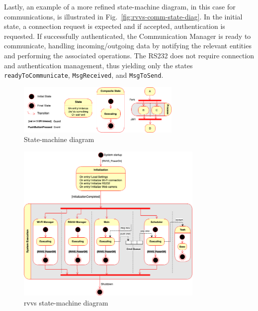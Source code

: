Lastly, an example of a more refined state-machine diagram, in this case for
communications, is illustrated in Fig.~\ref{fig:rvvs-comm-state-diag}. In the
initial state, a connection request is expected and if accepted, authentication
is requested. If successfully authenticated, the Communication Manager is ready
to communicate, handling incoming/outgoing data by notifying the relevant
entities and performing the associated operations. The RS232 does not require
connection and authentication management, thus yielding only the states
\texttt{readyToCommunicate}, \texttt{MsgReceived}, and \texttt{MsgToSend}. 
\begin{figure}[!hbt]
\centering
    \includegraphics[width=0.7\textwidth]{./img/state-diag-caption.png}
  \caption{State-machine diagram}%
\label{fig:state-mach-diag-legend}
\end{figure}
\begin{figure}[!hbt]
\centering
    \includegraphics[width=0.8\textwidth]{./img/rvvs-sync-state-diag.png}
  \caption{\acrshort{rvvs} state-machine diagram}%
\label{fig:rvvs-sync-state-diag}
\end{figure}
